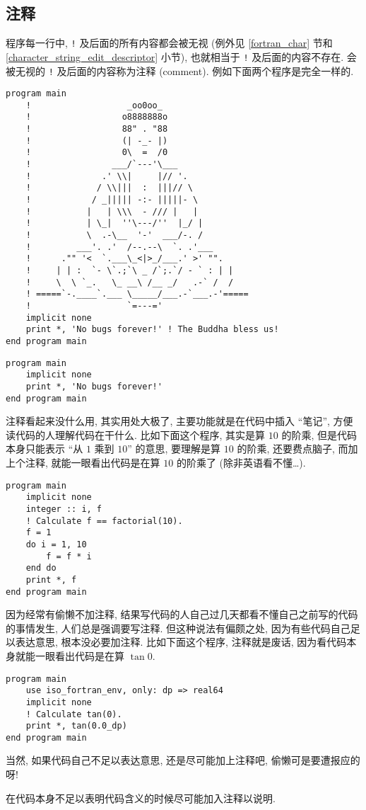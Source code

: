 \subsection{注释}

程序每一行中, \texttt{!} 及后面的所有内容都会被无视 (例外见 \ref{fortran_char} 节和 \ref{character_string_edit_descriptor} 小节), 也就相当于 \texttt{!} 及后面的内容不存在. 会被无视的 \texttt{!} 及后面的内容称为注释 (comment). 例如下面两个程序是完全一样的.
\begin{lstlisting}
program main
    !                   _oo0oo_
    !                  o8888888o
    !                  88" . "88
    !                  (| -_- |)
    !                  0\  =  /0
    !                ___/`---'\___
    !              .' \\|     |// '.
    !             / \\|||  :  |||// \
    !            / _||||| -:- |||||- \
    !           |   | \\\  - /// |   |
    !           | \_|  ''\---/''  |_/ |
    !           \  .-\__  '-'  ___/-. /
    !         ___'. .'  /--.--\  `. .'___
    !      ."" '<  `.___\_<|>_/___.' >' "".
    !     | | :  `- \`.;`\ _ /`;.`/ - ` : | |
    !     \  \ `_.   \_ __\ /__ _/   .-` /  /
    ! =====`-.____`.___ \_____/___.-`___.-'=====
    !                   `=---='
    implicit none
    print *, 'No bugs forever!' ! The Buddha bless us!
end program main
\end{lstlisting}
\begin{lstlisting}
program main
    implicit none
    print *, 'No bugs forever!'
end program main
\end{lstlisting}

注释看起来没什么用, 其实用处大极了, 主要功能就是在代码中插入 ``笔记'', 方便读代码的人理解代码在干什么. 比如下面这个程序, 其实是算 $10$ 的阶乘, 但是代码本身只能表示 ``从 $1$ 乘到 $10$'' 的意思, 要理解是算 $10$ 的阶乘, 还要费点脑子, 而加上个注释, 就能一眼看出代码是在算 $10$ 的阶乘了 (除非英语看不懂\dots{}).
\begin{lstlisting}
program main
    implicit none
    integer :: i, f
    ! Calculate f == factorial(10).
    f = 1
    do i = 1, 10
        f = f * i
    end do
    print *, f
end program main
\end{lstlisting}

因为经常有偷懒不加注释, 结果写代码的人自己过几天都看不懂自己之前写的代码的事情发生, 人们总是强调要写注释. 但这种说法有偏颇之处, 因为有些代码自己足以表达意思, 根本没必要加注释. 比如下面这个程序, 注释就是废话, 因为看代码本身就能一眼看出代码是在算 $\tan 0$.
\begin{lstlisting}
program main
    use iso_fortran_env, only: dp => real64
    implicit none
    ! Calculate tan(0).
    print *, tan(0.0_dp)
end program main
\end{lstlisting}
当然, 如果代码自己不足以表达意思, 还是尽可能加上注释吧, 偷懒可是要遭报应的呀!
\begin{convention}
    在代码本身不足以表明代码含义的时候尽可能加入注释以说明.
\end{convention}

